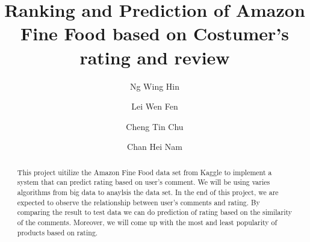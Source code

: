 \documentclass[sigconf]{acmart}
\begin{document}
\title{Ranking and Prediction of Amazon Fine Food based on Costumer's rating and review}

\author{Ng Wing Hin}

\author{Lei Wen Fen}

\author{Cheng Tin Chu}

\author{Chan Hei Nam}


\begin{abstract}
This project uitilize the Amazon Fine Food data set from Kaggle to implement a system that can predict rating based on user's comment. We will be using varies algorithms from big data to anaylsis the data set. In the end of this project, we are expected to observe the relationship between user's comments and rating. By comparing the result to test data we can do prediction of rating based on the similarity of the comments. Moreover, we will come up with the most and least popularity of products based on rating.
\end{abstract}
\maketitle



%
% 
\end{document}
